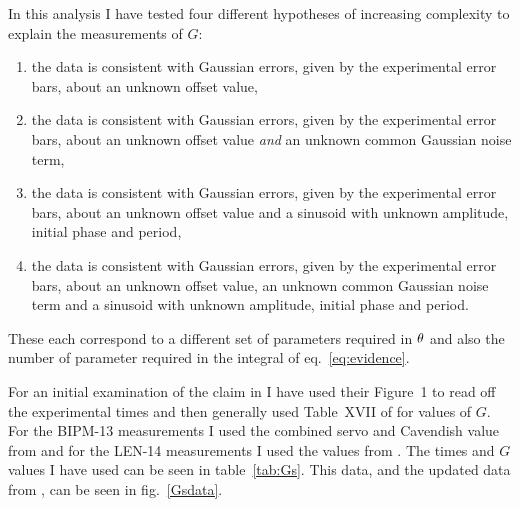 \documentclass[page-classic]{epl2}
\begin{document}
In this analysis I have tested four different hypotheses of increasing complexity to explain the measurements of $G$:
\begin{enumerate}
 \item the data is consistent with Gaussian errors, given by the experimental error bars, about an unknown
 offset value,
 \item the data is consistent with Gaussian errors, given by the experimental error bars, about an unknown
 offset value {\it and} an unknown common Gaussian noise term,
 \item the data is consistent with Gaussian errors, given by the experimental error bars, about an unknown
 offset value and a sinusoid with unknown amplitude, initial phase and period,
 \item the data is consistent with Gaussian errors, given by the experimental error bars, about an unknown
 offset value, an unknown common Gaussian noise term and a sinusoid with unknown amplitude, initial phase and period.
\end{enumerate}
These each correspond to a different set of parameters required in $\mathbf{\theta}$ and also the number of
parameter required in the integral of eq.~\ref{eq:evidence}.

For an initial examination of the claim in \cite{2015EL....11010002A} I have used their Figure~1 to read off
the experimental times and then generally used Table~XVII of \cite{RevModPhys.84.1527} for values of $G$.
For the BIPM-13 measurements I used the combined servo and Cavendish value from \cite{PhysRevLett.113.039901}
and for the LEN-14 measurements I used the values from \cite{2014Natur.510..518R}. The times and $G$ values I
have used can be seen in table~\ref{tab:Gs}. This data, and the updated data from \cite{2015arXiv150501774S},
can be seen in fig.~\ref{Gsdata}.
\end{document}
